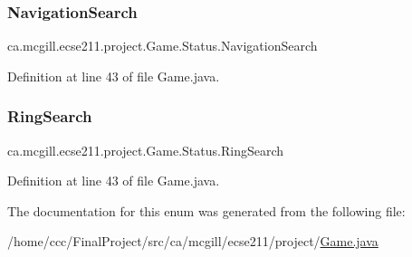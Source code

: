 \subsubsection{\texorpdfstring{Navigation\+Search}{NavigationSearch}}
{\footnotesize\ttfamily ca.\+mcgill.\+ecse211.\+project.\+Game.\+Status.\+Navigation\+Search}



Definition at line 43 of file Game.\+java.

\mbox{\label{enumca_1_1mcgill_1_1ecse211_1_1project_1_1_game_1_1_status_a6cb7397203bf9fa47c9486ede1e8fd6d}} 
\subsubsection{\texorpdfstring{Ring\+Search}{RingSearch}}
{\footnotesize\ttfamily ca.\+mcgill.\+ecse211.\+project.\+Game.\+Status.\+Ring\+Search}



Definition at line 43 of file Game.\+java.



The documentation for this enum was generated from the following file\+:\begin{DoxyCompactItemize}
\item 
/home/ccc/\+Final\+Project/src/ca/mcgill/ecse211/project/\hyperlink{_game_8java}{Game.\+java}\end{DoxyCompactItemize}

